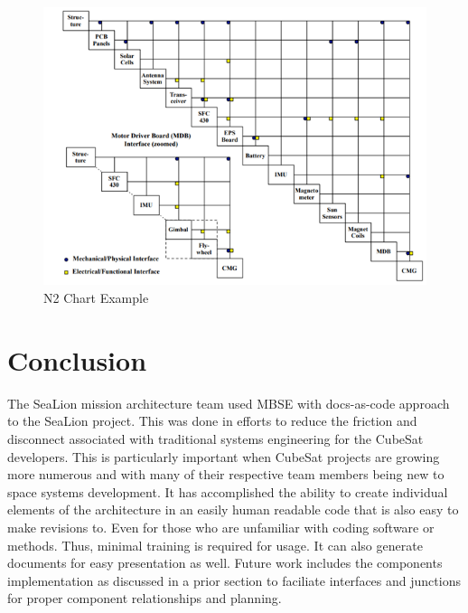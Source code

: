 \documentclass[journal,article,submit,pdftex,moreauthors]{Definitions/mdpi}
\begin{document}
\begin{figure}[H]
    \includegraphics[width=10.5 cm]{assets/N2.png}
    \caption{N2 Chart Example}
	\label{fig:N2}
    \end{figure}   
\unskip

\section{Conclusion}
The SeaLion mission architecture team used MBSE with docs-as-code approach to the SeaLion project. This was done in efforts to reduce the friction and disconnect associated with traditional systems engineering for the CubeSat developers.  This is particularly important when CubeSat projects are growing more numerous and with many of their respective team members being new to space systems development.   It has accomplished the ability to create individual elements of the architecture in an easily human readable code that is also easy to make revisions to.  Even for those who are unfamiliar with coding software or methods.  Thus, minimal training is required for usage.  It can also generate documents for easy presentation as well.  Future work includes the components implementation as discussed in a prior section to faciliate interfaces and junctions for proper component relationships and planning.

\vspace{6pt} 

\end{document}
